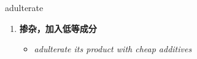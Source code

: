 
\begin{frame}
{\huge adulterate}
\begin{center}
\begin{enumerate}\Large
  \item \textbf{掺杂，加入低等成分}
  \begin{itemize}
    \item \em{\Large{adulterate its product with cheap additives}}
  \end{itemize}
\end{enumerate}
\end{center}
\end{frame}
